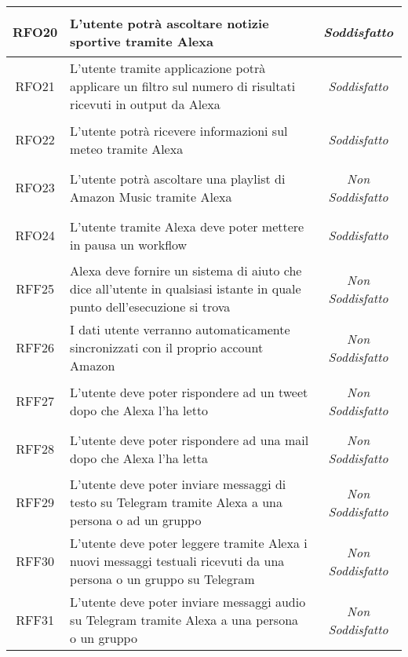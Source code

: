 \begin{longtable}{|c|>{\centering}m{7cm}|c|}
	\hypertarget{RFO20}{RFO20} & L'utente potrà ascoltare notizie sportive tramite Alexa & \textit{Soddisfatto}\\ \hline
	
	\hypertarget{RFO21}{RFO21} & L'utente tramite applicazione potrà applicare un filtro sul numero di risultati ricevuti in output da Alexa & \textit{Soddisfatto}\\ \hline
	
	\hypertarget{RFO22}{RFO22} & L'utente potrà ricevere informazioni sul meteo tramite Alexa & \textit{Soddisfatto}\\ \hline
	
	\hypertarget{RFO23}{RFO23} & L'utente potrà ascoltare una playlist di Amazon Music tramite Alexa & \textit{Non Soddisfatto}\\ \hline
	
	\hypertarget{RFO24}{RFO24} & L'utente tramite Alexa deve poter mettere in pausa un workflow & \textit{Soddisfatto}\\ \hline
	
	\hypertarget{RFF25}{RFF25} & Alexa deve fornire un sistema di aiuto che dice all'utente in qualsiasi istante in quale punto dell'esecuzione si trova & \textit{Non Soddisfatto}\\ \hline
	
	\hypertarget{RFF26}{RFF26} & I dati utente verranno automaticamente sincronizzati con il proprio account Amazon & \textit{Non Soddisfatto}\\ \hline
	
	\hypertarget{RFF27}{RFF27} & L'utente deve poter rispondere ad un tweet dopo che Alexa l'ha letto & \textit{Non Soddisfatto}\\ \hline
	
	\hypertarget{RFF28}{RFF28} & L'utente deve poter rispondere ad una mail dopo che Alexa l'ha letta & \textit{Non Soddisfatto}\\ \hline
	
	\hypertarget{RFF29}{RFF29} & L'utente deve poter inviare messaggi di testo su Telegram tramite Alexa a una persona o ad un gruppo & \textit{Non Soddisfatto}\\ \hline
	
	\hypertarget{RFF30}{RFF30} &  L'utente deve poter leggere tramite Alexa i nuovi messaggi testuali ricevuti da una persona o un gruppo su Telegram & \textit{Non Soddisfatto}\\ \hline
	
	\hypertarget{RFF31}{RFF31} & L'utente deve poter inviare messaggi audio su Telegram tramite Alexa a una persona o un gruppo & \textit{Non Soddisfatto}\\ \hline
	

\end{longtable}

